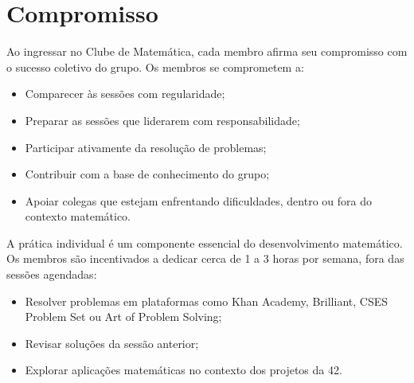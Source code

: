 \clearpage

\section{Compromisso}

Ao ingressar no Clube de Matemática, cada membro afirma seu compromisso com o sucesso
coletivo do grupo. Os membros se comprometem a:

\begin{itemize}
  \item Comparecer às sessões com regularidade;
  \item Preparar as sessões que liderarem com responsabilidade;
  \item Participar ativamente da resolução de problemas;
  \item Contribuir com a base de conhecimento do grupo;
  \item Apoiar colegas que estejam enfrentando dificuldades, dentro ou fora do contexto
    matemático.
\end{itemize}

A prática individual é um componente essencial do desenvolvimento matemático. Os membros
são incentivados a dedicar cerca de 1 a 3 horas por semana, fora das sessões agendadas:

\begin{itemize}
  \item Resolver problemas em plataformas como Khan Academy, Brilliant, CSES Problem Set
    ou Art of Problem Solving;
  \item Revisar soluções da sessão anterior;
  \item Explorar aplicações matemáticas no contexto dos projetos da 42.
\end{itemize}

